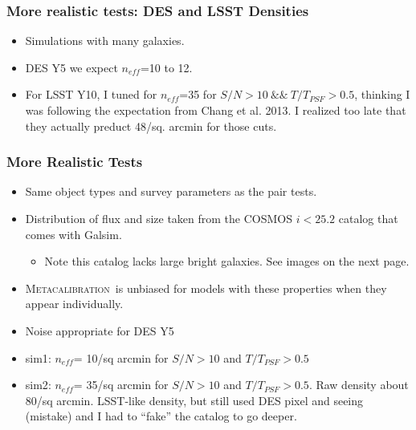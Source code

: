 \documentclass{beamer}
\newcommand{\Mcal}{\textsc{Metacalibration}}
\newcommand{\snr}{$S/N$}
\newcommand{\neff}{$n_{eff}$}
\begin{document}
\frame
{
    \frametitle{More realistic tests:  DES and LSST Densities}

    \begin{itemize}

        \item Simulations with many galaxies.

        \item DES Y5 we expect \neff=10 to 12.

        \item For LSST Y10, I tuned for {\color{brightred} \neff=35} for
            {\color{gold} \snr$ > 10 ~ \&\& ~ T/T_{PSF} > 0.5$}, thinking I was
            following the expectation from  Chang et al. 2013.  I realized too
            late that they actually preduct 48/sq. arcmin for those cuts.
            
    \end{itemize}
}

\frame
{
    \frametitle{More Realistic Tests}

 
    \begin{itemize}

        \item Same object types and survey parameters as the pair tests.

        \item Distribution of flux and size taken from the COSMOS $i<25.2$ catalog
            that comes with Galsim.
            \begin{itemize}
                \item Note this catalog lacks large bright galaxies. See images
                    on the next page.
            \end{itemize}

        \item \Mcal\ is unbiased for models with these properties when they
            appear individually.

        \item Noise appropriate for DES Y5

        \item {\color{lightsteelblue} sim1}: \neff={\color{green} 10}/sq arcmin for $S/N > 10$ and $T/T_{PSF} > 0.5$
            
        \item {\color{lightsteelblue} sim2}: \neff={\color{brightred} 35}/sq
            arcmin for $S/N > 10$ and $T/T_{PSF} > 0.5$.  Raw density about
            80/sq arcmin.  LSST-like density, but still used DES pixel and
            seeing (mistake) and I had to ``fake'' the catalog to go deeper.


    \end{itemize}

}
\end{document}
